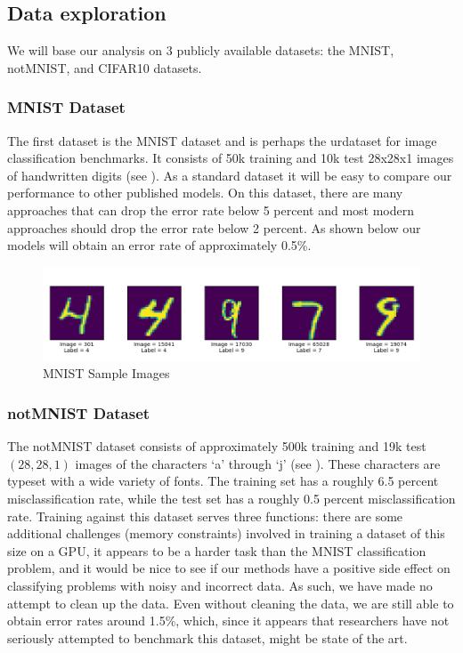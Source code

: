 \documentclass[english,a4paper,oneside]{amsart}
\theoremstyle{definition}
\begin{document}
\subsection{Data exploration}
We will base our analysis on 3 publicly available datasets: the MNIST,  notMNIST, and CIFAR10 datasets. 

\subsubsection{MNIST Dataset}
The first dataset is the MNIST dataset and is perhaps the urdataset for image classification benchmarks. It consists of 50k training and 10k test 28x28x1 images of handwritten digits (see ). As a standard dataset it will be easy to compare our performance to other published models. On this dataset, there are many approaches that can drop the error rate below 5 percent and most modern approaches should drop the error rate below 2 percent.  As shown below our models will obtain an error rate of approximately 0.5\%.
\begin{figure}[H]
	\begin{center} \includegraphics[scale=0.5]{images/MNIST_Sample_Images.png}\end{center}
	\caption{MNIST Sample Images}\label{MNISTFig}
\end{figure}

\subsubsection{notMNIST Dataset}
The notMNIST dataset consists of approximately 500k training and 19k test $(28,28,1)$ images of the characters `a' through `j' (see ). These characters are typeset with a wide variety of fonts. The training set has a roughly 6.5 percent misclassification rate, while the test set has a roughly 0.5 percent misclassification rate. Training against this dataset serves three functions: there are some additional challenges (memory constraints) involved in training a dataset of this size on a GPU, it appears to be a harder task than the MNIST classification problem, and it would be nice to see if our methods have a positive side effect on classifying problems with noisy and incorrect data. As such, we have made no attempt to clean up the data. Even without cleaning the data, we are still able to obtain error rates around 1.5\%, which, since it appears that researchers have not seriously attempted to benchmark this dataset, might be state of the art.
\end{document}
